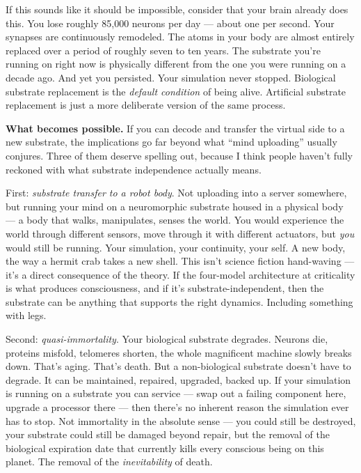 \documentclass[11pt, twoside, openright]{book}
\begin{document}
If this sounds like it should be impossible, consider that your brain already does this. You lose roughly 85,000 neurons per day --- about one per second. Your synapses are continuously remodeled. The atoms in your body are almost entirely replaced over a period of roughly seven to ten years. The substrate you're running on right now is physically different from the one you were running on a decade ago. And yet you persisted. Your simulation never stopped. Biological substrate replacement is the \textit{default condition} of being alive. Artificial substrate replacement is just a more deliberate version of the same process.

\textbf{What becomes possible.} If you can decode and transfer the virtual side to a new substrate, the implications go far beyond what ``mind uploading'' usually conjures. Three of them deserve spelling out, because I think people haven't fully reckoned with what substrate independence actually means.

First: \textit{substrate transfer to a robot body}. Not uploading into a server somewhere, but running your mind on a neuromorphic substrate housed in a physical body --- a body that walks, manipulates, senses the world. You would experience the world through different sensors, move through it with different actuators, but \textit{you} would still be running. Your simulation, your continuity, your self. A new body, the way a hermit crab takes a new shell. This isn't science fiction hand-waving --- it's a direct consequence of the theory. If the four-model architecture at criticality is what produces consciousness, and if it's substrate-independent, then the substrate can be anything that supports the right dynamics. Including something with legs.

Second: \textit{quasi-immortality}. Your biological substrate degrades. Neurons die, proteins misfold, telomeres shorten, the whole magnificent machine slowly breaks down. That's aging. That's death. But a non-biological substrate doesn't have to degrade. It can be maintained, repaired, upgraded, backed up. If your simulation is running on a substrate you can service --- swap out a failing component here, upgrade a processor there --- then there's no inherent reason the simulation ever has to stop. Not immortality in the absolute sense --- you could still be destroyed, your substrate could still be damaged beyond repair, but the removal of the biological expiration date that currently kills every conscious being on this planet. The removal of the \textit{inevitability} of death.
\end{document}
